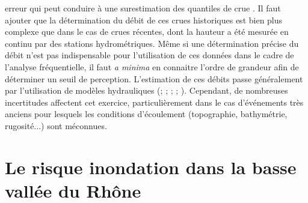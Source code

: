 erreur qui peut conduire à une surestimation des quantiles de crue \citep{prosdocimi_german_2018}. Il faut ajouter que la détermination du débit de ces crues historiques est bien plus complexe que dans le cas de crues récentes, dont la hauteur a été mesurée en continu par des stations hydrométriques. Même si une détermination précise du débit n'est pas indispensable pour l'utilisation de ces données dans le cadre de l'analyse fréquentielle, il faut \textit{a minima} en connaitre l'ordre de grandeur afin de déterminer un seuil de perception. L'estimation de ces débits passe généralement par l'utilisation de modèles hydrauliques (\cite{naulet_flood_2005}; \cite{neppel_flood_2010}; \cite{wetter_largest_2011}; \cite{machado_flood_2015}; \cite{ruiz-bellet_uncertainty_2017}). Cependant, de nombreuses incertitudes affectent cet exercice, particulièrement dans le cas d'événements très anciens pour lesquels les conditions d'écoulement (topographie, bathymétrie, rugosité...) sont méconnues. 

\newpage
	\section*{Le risque inondation dans la basse vallée du Rhône}
	

